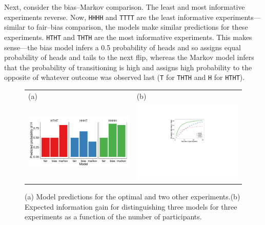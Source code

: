 \documentclass{article}
\begin{document}
Next, consider the bias--Markov comparison.
The least and most informative experiments reverse.
Now, \lstinline{HHHH} and \lstinline{TTTT} are the least informative experiments---similar to fair--bias comparison, the models make similar predictions for these experiments.
\lstinline{HTHT} and \lstinline{THTH} are the most informative experiments.
This makes sense---the bias model infers a 0.5 probability of heads and so assigns equal probability of heads and tails to the next flip, whereas the Markov model infers that the probability of transitioning is high and assigns high probability to the opposite of whatever outcome was observed last (\lstinline{T} for \lstinline{THTH} and \lstinline{H} for \lstinline{HTHT}).



\begin{figure}[t]
\centering
\begin{tabular}{l l}
(a) & (b)\\
\includegraphics[width=0.6\columnwidth]{img/coin_predictions.pdf} &
\includegraphics[width=0.4\columnwidth]{img/coin_eig_3way_nsubj_wlegend.pdf} \\\end{tabular}
\caption{(a) Model predictions for the optimal and two other experiments.(b) Expected information gain for distinguishing three models for three experiments as a function of the number of participants.}
\label{fig:coin_preds}
\end{figure}
\end{document}
